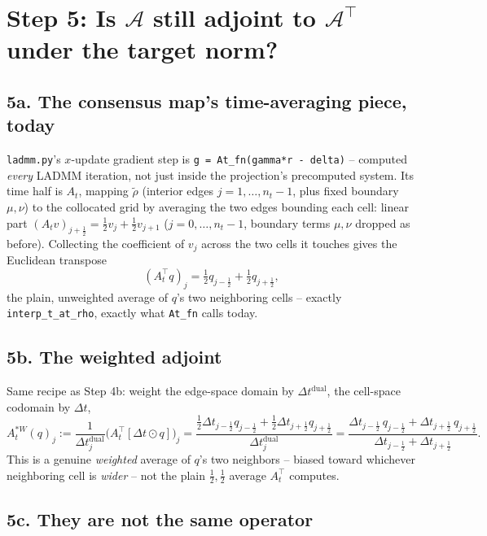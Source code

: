 \documentclass[11pt]{article}
\newcommand{\dt}{\Delta t}
\newcommand{\code}[1]{\texttt{#1}}
\newcommand{\half}{\tfrac12}
\begin{document}
\section*{Step 5: Is $\mathcal{A}$ still adjoint to $\mathcal{A}^\top$ under the target norm?}

\subsection*{5a. The consensus map's time-averaging piece, today}

\code{ladmm.py}'s $x$-update gradient step is \code{g = At\_fn(gamma*r - delta)} -- computed
\emph{every} LADMM iteration, not just inside the projection's precomputed system. Its time half is
$A_t$, mapping $\tilde\rho$ (interior edges $j=1,\dots,n_t-1$, plus fixed boundary $\mu,\nu$) to the
collocated grid by averaging the two edges bounding each cell: linear part
$(A_tv)_{j+\half} = \half v_j+\half v_{j+1}$ ($j=0,\dots,n_t-1$, boundary terms $\mu,\nu$ dropped
as before). Collecting the coefficient of $v_j$ across the two cells it touches gives the Euclidean
transpose
\[
  (A_t^\top q)_j = \half q_{j-\half} + \half q_{j+\half},
\]
the plain, unweighted average of $q$'s two neighboring cells -- exactly \code{interp\_t\_at\_rho},
exactly what \code{At\_fn} calls today.

\subsection*{5b. The weighted adjoint}

Same recipe as Step 4b: weight the edge-space domain by $\dt^\mathrm{dual}$, the cell-space
codomain by $\dt$,
\[
  A_t^{*W}(q)_j := \frac{1}{\dt_j^\mathrm{dual}}\bigl(A_t^\top[\dt\odot q]\bigr)_j
  = \frac{\half\dt_{j-\half}q_{j-\half}+\half\dt_{j+\half}q_{j+\half}}{\dt_j^\mathrm{dual}}
  = \frac{\dt_{j-\half}\,q_{j-\half}+\dt_{j+\half}\,q_{j+\half}}{\dt_{j-\half}+\dt_{j+\half}}.
\]
This is a genuine \emph{weighted} average of $q$'s two neighbors -- biased toward whichever
neighboring cell is \emph{wider} -- not the plain $\half,\half$ average $A_t^\top$ computes.

\subsection*{5c. They are not the same operator}
\end{document}
